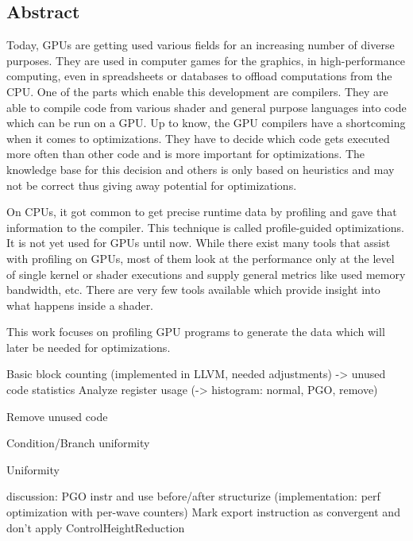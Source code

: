 \newpage
\vspace*{3.5cm}
\begin{center}
\begin{minipage}{12.5cm}
\section*{Abstract}
Today, GPUs are getting used various fields for an increasing number of diverse purposes. They are used in computer games for the graphics, in high-performance computing, even in spreadsheets or databases to offload computations from the CPU.
One of the parts which enable this development are compilers. They are able to compile code from various shader and general purpose languages into code which can be run on a GPU.
Up to know, the GPU compilers have a shortcoming when it comes to optimizations. They have to decide which code gets executed more often than other code and is more important for optimizations.
The knowledge base for this decision and others is only based on heuristics and may not be correct thus giving away potential for optimizations.

On CPUs, it got common to get precise runtime data by profiling and gave that information to the compiler. This technique is called profile-guided optimizations. It is not yet used for GPUs until now.
While there exist many tools that assist with profiling on GPUs, most of them look at the performance only at the level of single kernel or shader executions and supply general metrics like used memory bandwidth, etc.
There are very few tools available which provide insight into what happens inside a shader.

This work focuses on profiling GPU programs to generate the data which will later be needed for optimizations.

Basic block counting (implemented in LLVM, needed adjustments)
-> unused code statistics
Analyze register usage (-> histogram: normal, PGO, remove)

Remove unused code

Condition/Branch uniformity

Uniformity

discussion: PGO instr and use before/after structurize
(implementation: perf optimization with per-wave counters)
Mark export instruction as convergent and don’t apply ControlHeightReduction

\end{minipage}
\end{center}



